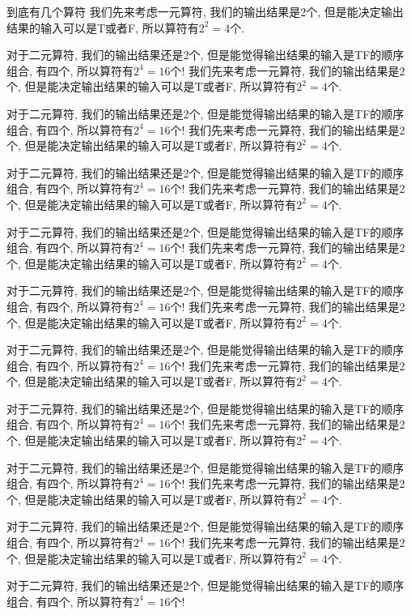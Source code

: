 \documentclass[zihao=-4,a4paper]{ctexart}
\begin{document}
\begin{mnote}{到底有几个算符}
	我们先来考虑一元算符, 我们的输出结果是2个, 但是能决定输出结果的输入可以是T或者F, 所以算符有$2^2=4$个.
	
	对于二元算符, 我们的输出结果还是2个, 但是能觉得输出结果的输入是TF的顺序组合, 有四个, 所以算符有$2^4=16$个!
		我们先来考虑一元算符, 我们的输出结果是2个, 但是能决定输出结果的输入可以是T或者F, 所以算符有$2^2=4$个.
	
	对于二元算符, 我们的输出结果还是2个, 但是能觉得输出结果的输入是TF的顺序组合, 有四个, 所以算符有$2^4=16$个!
		我们先来考虑一元算符, 我们的输出结果是2个, 但是能决定输出结果的输入可以是T或者F, 所以算符有$2^2=4$个.
	
	对于二元算符, 我们的输出结果还是2个, 但是能觉得输出结果的输入是TF的顺序组合, 有四个, 所以算符有$2^4=16$个!
		我们先来考虑一元算符, 我们的输出结果是2个, 但是能决定输出结果的输入可以是T或者F, 所以算符有$2^2=4$个.
	
	对于二元算符, 我们的输出结果还是2个, 但是能觉得输出结果的输入是TF的顺序组合, 有四个, 所以算符有$2^4=16$个!
		我们先来考虑一元算符, 我们的输出结果是2个, 但是能决定输出结果的输入可以是T或者F, 所以算符有$2^2=4$个.
	
	对于二元算符, 我们的输出结果还是2个, 但是能觉得输出结果的输入是TF的顺序组合, 有四个, 所以算符有$2^4=16$个!
		我们先来考虑一元算符, 我们的输出结果是2个, 但是能决定输出结果的输入可以是T或者F, 所以算符有$2^2=4$个.
	
	对于二元算符, 我们的输出结果还是2个, 但是能觉得输出结果的输入是TF的顺序组合, 有四个, 所以算符有$2^4=16$个!
		我们先来考虑一元算符, 我们的输出结果是2个, 但是能决定输出结果的输入可以是T或者F, 所以算符有$2^2=4$个.
	
	对于二元算符, 我们的输出结果还是2个, 但是能觉得输出结果的输入是TF的顺序组合, 有四个, 所以算符有$2^4=16$个!
		我们先来考虑一元算符, 我们的输出结果是2个, 但是能决定输出结果的输入可以是T或者F, 所以算符有$2^2=4$个.
	
	对于二元算符, 我们的输出结果还是2个, 但是能觉得输出结果的输入是TF的顺序组合, 有四个, 所以算符有$2^4=16$个!
		我们先来考虑一元算符, 我们的输出结果是2个, 但是能决定输出结果的输入可以是T或者F, 所以算符有$2^2=4$个.
	
	对于二元算符, 我们的输出结果还是2个, 但是能觉得输出结果的输入是TF的顺序组合, 有四个, 所以算符有$2^4=16$个!
		我们先来考虑一元算符, 我们的输出结果是2个, 但是能决定输出结果的输入可以是T或者F, 所以算符有$2^2=4$个.
	
	对于二元算符, 我们的输出结果还是2个, 但是能觉得输出结果的输入是TF的顺序组合, 有四个, 所以算符有$2^4=16$个!
\end{mnote}
\end{document}
